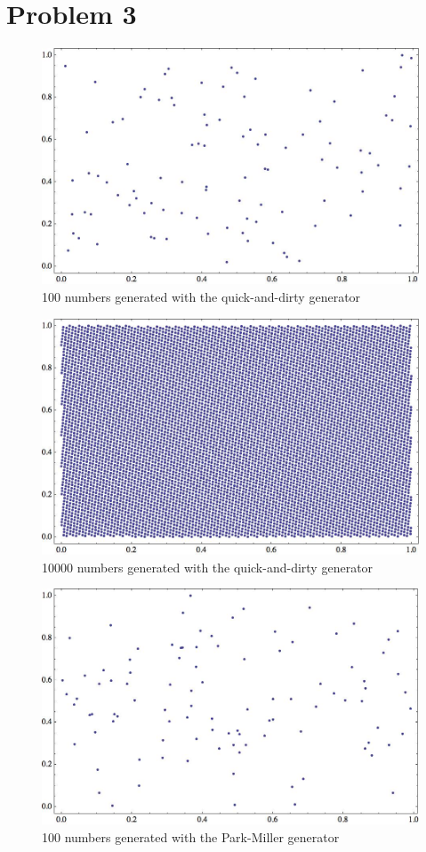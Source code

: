 \documentclass[12pt]{article}
\numberwithin{equation}{section}
\numberwithin{table}{section}
\begin{document}
\section*{Problem 3}
\begin{figure}
\caption{100 numbers generated with the quick-and-dirty generator}
\includegraphics[width=15cm]{qd1.jpg}
\end{figure}
\begin{figure}
\caption{10000 numbers generated with the quick-and-dirty generator}
\includegraphics[width=15cm]{qd2.jpg}
\end{figure}
\begin{figure}
\caption{100 numbers generated with the Park-Miller generator}
\includegraphics[width=15cm]{pm1.jpg}
\end{figure}
\end{document}
